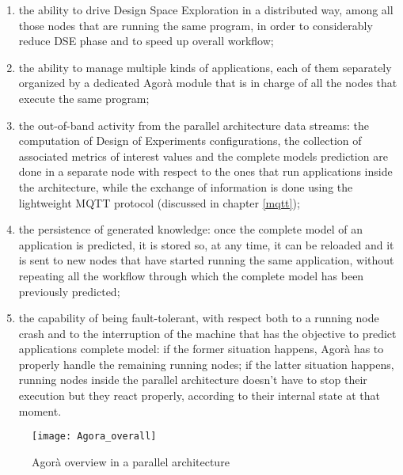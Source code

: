 \begin{enumerate}
    
    \item the ability to drive Design Space Exploration in a distributed way, among all those nodes that are running the same program, in order to considerably reduce DSE phase and to speed up overall workflow;
    
    \item the ability to manage multiple kinds of applications, each of them separately organized by a dedicated Agorà module that is in charge of all the nodes that execute the same program;
    
    \item the out-of-band activity from the parallel architecture data streams: the computation of Design of Experiments configurations, the collection of associated metrics of interest values and the complete models prediction are done in a separate node with respect to the ones that run applications inside the architecture, while the exchange of information is done using the lightweight MQTT protocol (discussed in chapter \ref{mqtt});
    
    \item the persistence of generated knowledge: once the complete model of an application is predicted, it is stored so, at any time, it can be reloaded and it is sent to new nodes that have started running the same application, without repeating all the workflow through which the complete model has been previously predicted;
    
    \item the capability of being fault-tolerant, with respect both to a running node crash and to the interruption of the machine that has the objective to predict applications complete model: if the former situation happens, Agorà has to properly handle the remaining running nodes; if the latter situation happens, running nodes inside the parallel architecture doesn't have to stop their execution but they react properly, according to their internal state at that moment.

\end{enumerate}

\begin{figure}[H]

    \centering
    \texttt{[image: Agora\_overall]}
    \caption{Agorà overview in a parallel architecture}
    \label{fig::tesiCris_overview}
    
\end{figure}

